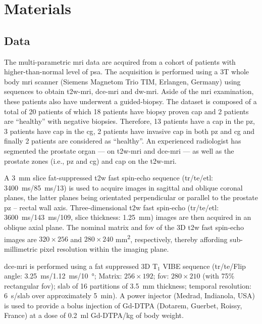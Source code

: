 \section{Materials}\label{sec:materials}

\subsection{Data}\label{sec:data}

The multi-parametric \ac{mri} data are acquired from a cohort of patients with higher-than-normal level of \ac{psa}.
The acquisition is performed using a 3T whole body \ac{mri} scanner (Siemens Magnetom Trio TIM, Erlangen, Germany) using sequences to obtain \ac{t2w}-\ac{mri}, \ac{dce}-\ac{mri} and \ac{dw}-\ac{mri}.
Aside of the \ac{mri} examination, these patients also have underwent a guided-biopsy.
The dataset is composed of a total of 20 patients of which 18 patients have biopsy proven \ac{cap} and 2 patients are ``healthy'' with negative biopsies.
Therefore, 13 patients have a \ac{cap} in the \ac{pz}, 3 patients have \ac{cap} in the \ac{cg}, 2 patients have invasive \ac{cap} in both \ac{pz} and \ac{cg} and finally 2 patients are considered as ``healthy''.
An experienced radiologist has segmented the prostate organ --- on \ac{t2w}-\ac{mri} and \ac{dce}-\ac{mri} --- as well as the prostate zones (i.e., \ac{pz} and \ac{cg}) and \ac{cap} on the \ac{t2w}-\ac{mri}.

A \SI{3}{\mm} slice fat-suppressed \ac{t2w} fast spin-echo sequence (\ac{tr}/\ac{te}/\ac{etl}: \SI{3400}{\ms}/\SI{85}{\ms}/13) is used to acquire images in sagittal and oblique coronal planes, the latter planes being orientated perpendicular or parallel to the prostate \ac{pz} – rectal wall axis.
Three-dimensional \ac{t2w} fast spin-echo (\ac{tr}/\ac{te}/\ac{etl}: \SI{3600}{\ms}/\SI{143}{\ms}/109, slice thickness: \SI{1.25}{\mm}) images are then acquired in an oblique axial plane.
The nominal matrix and \ac{fov} of the 3D \ac{t2w} fast spin-echo images are $320 \times 256$ and $280 \times 240$ mm\textsuperscript{2}, respectively, thereby affording sub-millimetric pixel resolution within the imaging plane.

\ac{dce}-\ac{mri} is performed using a fat suppressed 3D T$_1$ VIBE sequence (\ac{tr}/\ac{te}/Flip angle: \SI{3.25}{\ms}/\SI{1.12}{\ms}/\SI{10}{\degree}; Matrix: $256 \times 192$; \ac{fov}: $280 \times 210$ (with 75\% rectangular \ac{fov}); slab of 16 partitions of \SI{3.5}{\mm} thickness; temporal resolution: \SI{6}{\s}/slab over approximately \SI{5}{\minute}).
A power injector (Medrad, Indianola, USA) is used to provide a bolus injection of Gd-DTPA (Dotarem, Guerbet, Roissy, France) at a dose of \SI{0.2}{\ml} Gd-DTPA/kg of body weight.

